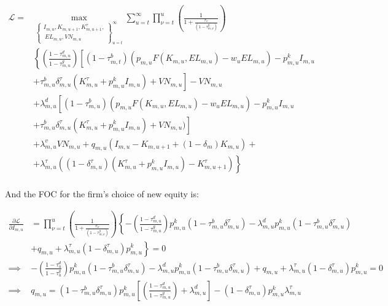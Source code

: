 \documentclass[letterpaper,12pt]{article}
\theoremstyle{definition}
\begin{document}
\begin{spacing}{1.5}
\begin{equation}
\label{eqn:firm_lagrange_tax2}
\begin{split}
\mathcal{L} = &  \max_{\left\{\substack{I_{m,u},K_{m,u+1},K^{\tau}_{m,u+1},\\\ EL_{m,u},VN_{m,u}}\right\}_{u=t}^{\infty}} \sum_{u=t}^{\infty} \prod_{\nu=t}^{u} \left(\frac{1}{1+\frac{r_{v}}{(1-\tau^{g}_{m,\nu})}}\right)\\
& \left\{ \left(\frac{1-\tau^{d}_{m,u}}{1-\tau^{g}_{m,u}}\right) \left[(1-\tau^{b}_{m,t})\left(p_{m,u}F(K_{m,u},EL_{m,u}) - w_{u}EL_{m,u}\right) -p^{k}_{m,u}I_{m,u}   \right. \right.\\
       & \left.\left. + \tau^{b}_{m,u}\delta^{\tau}_{m,u}(K^{\tau}_{m,u}+p^{k}_{m,u}I_{m,u}) +VN_{m,u}\right]  - VN_{m,u} \right. \\
       &+\left. \lambda^{d}_{m,u}\left[(1-\tau^{b}_{m,u})(p_{m,u}F(K_{m,u},EL_{m,u}) - w_{u}EL_{m,u}) -p^{k}_{m,u}I_{m,u} \right.\right. \\ 
       & \left.\left. + \tau^{b}_{m,u}\delta^{\tau}_{m,u}(K^{\tau}_{m,u}+p^{k}_{m,u}I_{m,u}) +VN_{m,u})\right] \right. \\
       &+ \left. \lambda^{v}_{m,u}VN_{m,u} + q_{m,u}(I_{m,u} - K_{m,u+1} +(1-\delta_{m})K_{m,u}) + \right. \\
       & +\left. \lambda^{\tau}_{m,u}((1-\delta^{\tau}_{m,u})(K^{\tau}_{m,u}+p^{k}_{m,u}I_{m,u}) - K^{\tau}_{m,u+1})\right\}  \\
\end{split}
\end{equation}

And the FOC for the firm's choice of new equity is:

\begin{equation}
\label{eqn:lagrange_foc_i_tax}
\begin{split}
 \frac{\partial \mathcal{L}}{\partial I_{m,u}} & =   \prod_{\nu=t}^{u} \left(\frac{1}{1+\frac{r_{\nu}}{(1-\tau^{g}_{m,\nu})}}\right) \left\{-\left(\frac{1-\tau^{d}_{m,u}}{1-\tau^{g}_{m,u}}\right)p^{k}_{m,u}(1-\tau^{b}_{m,u}\delta^{\tau}_{m,u}) - \lambda^{d}_{m,u}p^{k}_{m,u}(1-\tau^{b}_{m,u}\delta^{\tau}_{m,u}) \right. \\
 & \left. + q_{m,u}  + \lambda^{\tau}_{m,u}(1-\delta^{\tau}_{m,u})p^{k}_{m,u} \right\} = 0 \\
\implies &-\left(\frac{1-\tau^{d}_{u}}{1-\tau^{g}_{u}}\right)p^{k}_{m,u}(1-\tau^{b}_{m,u}\delta^{\tau}_{m,u}) - \lambda^{d}_{m,u}p^{k}_{m,u}(1-\tau^{b}_{m,u}\delta^{\tau}_{m,u}) + q_{m,u}  + \lambda^{\tau}_{m,u}(1-\delta^{\tau}_{m,u})p^{k}_{m,u}  = 0 \\
\implies &  q_{m,u} = (1-\tau^{b}_{m,u}\delta^{\tau}_{m,u})p^{k}_{m,u}\left[\left(\frac{1-\tau^{d}_{m,u}}{1-\tau^{g}_{m,u}}\right) + \lambda^{d}_{m,u}\right] - (1-\delta^{\tau}_{m,u})p^{k}_{m,u}\lambda^{\tau}_{m,u}   \\
\end{split}
\end{equation}



\end{spacing}
\end{document}
